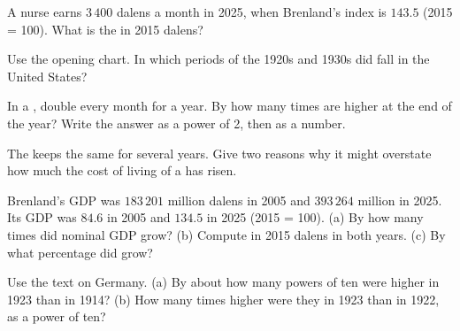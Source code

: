 \begin{exercise}[$\star\star$]\label{exo:g8:inflation-and-price-indices:6}
A nurse earns $3\,400$ dalens a month in 2025, when Brenland's index is $143.5$ (2015 = 100). What
is the  in 2015 dalens?
\end{exercise}

\begin{exercise}[$\star\star$]\label{exo:g8:inflation-and-price-indices:7}
Use the opening chart. In which periods of the 1920s and 1930s did  fall in the United
States?
\end{exercise}

\begin{exercise}[$\star\star$]\label{exo:g8:inflation-and-price-indices:8}
In a ,  double every month for a year. By how many times are  higher at
the end of the year? Write the answer as a power of 2, then as a number.
\end{exercise}

\begin{exercise}[$\star\star$]\label{exo:g8:inflation-and-price-indices:9}
The  keeps the same  for several years. Give two reasons why it might
overstate how much the cost of living of a  has risen.
\end{exercise}

\begin{exercise}[$\star\star\star$]\label{exo:g8:inflation-and-price-indices:10}
Brenland's GDP was $183\,201$ million dalens in 2005 and $393\,264$ million in 2025. Its GDP  was $84.6$ in 2005 and $134.5$ in 2025 (2015 = 100). (a) By how many times did nominal GDP
grow? (b) Compute  in 2015 dalens in both years. (c) By what percentage did  grow?
\end{exercise}

\begin{exercise}[$\star\star\star$]\label{exo:g8:inflation-and-price-indices:11}
Use the text on Germany. (a) By about how many powers of ten were  higher in 1923 than in
1914? (b) How many times higher were they in 1923 than in 1922, as a power of ten?
\end{exercise}


